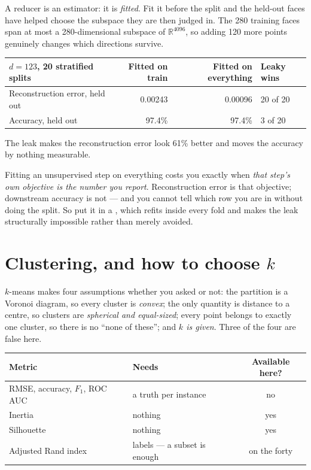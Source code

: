 \documentclass[11pt,a4paper]{article}
\begin{document}
A reducer is an estimator: it is \emph{fitted}. Fit it before the split and the
held-out faces have helped choose the subspace they are then judged in. The 280
training faces span at most a 280-dimensional subspace of $\mathbb{R}^{4096}$,
so adding 120 more points genuinely changes which directions survive.

\begin{center}
\small
\begin{tabular}{lrrl}
\toprule
\textbf{$d = 123$, 20 stratified splits} & \textbf{Fitted on train} &
\textbf{Fitted on everything} & \textbf{Leaky wins} \\
\midrule
Reconstruction error, held out & 0.00243 & 0.00096 & 20 of 20 \\
Accuracy, held out             & 97.4\%  & 97.4\%  & 3 of 20 \\
\bottomrule
\end{tabular}
\end{center}

\begin{failbox}[title={Failure condition --- the decision rule, and why it is still procedural}]
The leak makes the reconstruction error look 61\% better and moves the accuracy
by nothing measurable.

Fitting an unsupervised step on everything costs you exactly when \emph{that
step's own objective is the number you report}. Reconstruction error is that
objective; downstream accuracy is not --- and you cannot tell which row you are
in without doing the split. So put it in a , which refits inside
every fold and makes the leak structurally impossible rather than merely
avoided.
\end{failbox}

\section{Clustering, and how to choose $k$}

$k$-means makes four assumptions whether you asked or not: the partition is a
Voronoi diagram, so every cluster is \emph{convex}; the only quantity is
distance to a centre, so clusters are \emph{spherical and equal-sized}; every
point belongs to exactly one cluster, so there is no ``none of these''; and
\emph{$k$ is given}. Three of the four are false here.

\begin{center}
\small
\begin{tabular}{llc}
\toprule
\textbf{Metric} & \textbf{Needs} & \textbf{Available here?} \\
\midrule
RMSE, accuracy, $F_1$, ROC AUC & a truth per instance & no \\
Inertia   & nothing & yes \\
Silhouette & nothing & yes \\
Adjusted Rand index & labels --- a subset is enough & on the forty \\
\bottomrule
\end{tabular}
\end{center}
\end{document}
